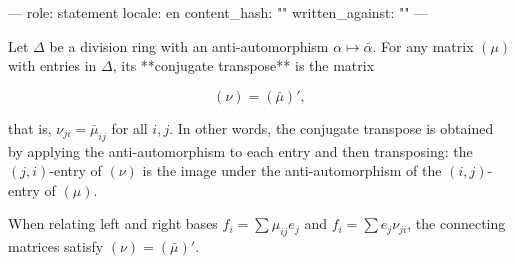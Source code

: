 ---
role: statement
locale: en
content_hash: ""
written_against: ""
---

Let $\Delta$ be a division ring with an anti-automorphism $\alpha \mapsto \bar{\alpha}$. For any matrix $(\mu)$ with entries in $\Delta$, its **conjugate transpose** is the matrix

$$(\nu) = (\bar{\mu})',$$

that is, $\nu_{ji} = \bar{\mu}_{ij}$ for all $i, j$. In other words, the conjugate transpose is obtained by applying the anti-automorphism to each entry and then transposing: the $(j,i)$-entry of $(\nu)$ is the image under the anti-automorphism of the $(i,j)$-entry of $(\mu)$.

When relating left and right bases $f_i = \sum \mu_{ij} e_j$ and $f_i = \sum e_j \nu_{ji}$, the connecting matrices satisfy $(\nu) = (\bar{\mu})'$.

